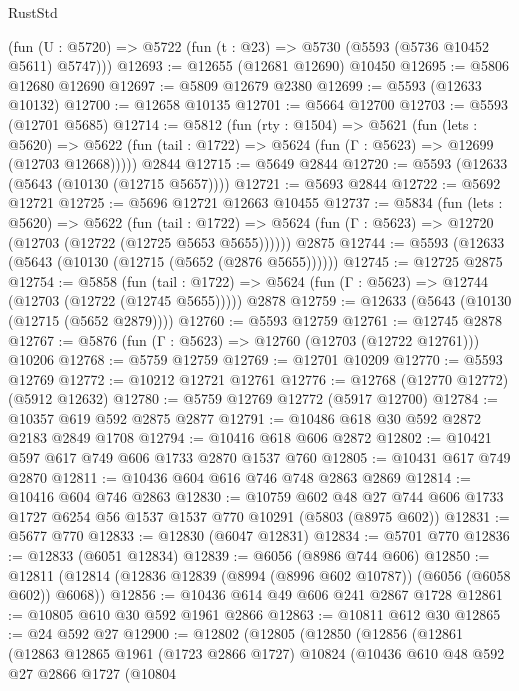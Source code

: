 \begin{lexlean}{RustStd}
\begin{coremodule}
    (fun (U : @5720) => @5722 (fun (t : @23) => @5730 (@5593 (@5736 @10452 @5611) @5747)))
@12693 := @12655 (@12681 @12690) @10450
@12695 := @5806 @12680 @12690
@12697 := @5809 @12679 @2380
@12699 := @5593 (@12633 @10132)
@12700 := @12658 @10135
@12701 := @5664 @12700
@12703 := @5593 (@12701 @5685)
@12714 := @5812
    (fun (rty : @1504) =>
    @5621
      (fun (lets : @5620) =>
      @5622 (fun (tail : @1722) => @5624 (fun (Γ : @5623) => @12699 (@12703 @12668)))))
    @2844
@12715 := @5649 @2844
@12720 := @5593 (@12633 (@5643 (@10130 (@12715 @5657))))
@12721 := @5693 @2844
@12722 := @5692 @12721
@12725 := @5696 @12721 @12663 @10455
@12737 := @5834
    (fun (lets : @5620) =>
    @5622
      (fun (tail : @1722) =>
      @5624 (fun (Γ : @5623) => @12720 (@12703 (@12722 (@12725 @5653 @5655))))))
    @2875
@12744 := @5593 (@12633 (@5643 (@10130 (@12715 (@5652 (@2876 @5655))))))
@12745 := @12725 @2875
@12754 := @5858
    (fun (tail : @1722) => @5624 (fun (Γ : @5623) => @12744 (@12703 (@12722 (@12745 @5655)))))
    @2878
@12759 := @12633 (@5643 (@10130 (@12715 (@5652 @2879))))
@12760 := @5593 @12759
@12761 := @12745 @2878
@12767 := @5876 (fun (Γ : @5623) => @12760 (@12703 (@12722 @12761))) @10206
@12768 := @5759 @12759
@12769 := @12701 @10209
@12770 := @5593 @12769
@12772 := @10212 @12721 @12761
@12776 := @12768 (@12770 @12772) (@5912 @12632)
@12780 := @5759 @12769 @12772 (@5917 @12700)
@12784 := @10357 @619 @592 @2875 @2877
@12791 := @10486 @618 @30 @592 @2872 @2183 @2849 @1708
@12794 := @10416 @618 @606 @2872
@12802 := @10421 @597 @617 @749 @606 @1733 @2870 @1537 @760
@12805 := @10431 @617 @749 @2870
@12811 := @10436 @604 @616 @746 @748 @2863 @2869
@12814 := @10416 @604 @746 @2863
@12830 := @10759
    @602
    @48
    @27
    @744
    @606
    @1733
    @1727
    @6254
    @56
    @1537
    @1537
    @770
    @10291
    (@5803 (@8975 @602))
@12831 := @5677 @770
@12833 := @12830 (@6047 @12831)
@12834 := @5701 @770
@12836 := @12833 (@6051 @12834)
@12839 := @6056 (@8986 @744 @606)
@12850 := @12811 (@12814 (@12836 @12839 (@8994 (@8996 @602 @10787)) (@6056 (@6058 @602)) @6068))
@12856 := @10436 @614 @49 @606 @241 @2867 @1728
@12861 := @10805 @610 @30 @592 @1961 @2866
@12863 := @10811 @612 @30
@12865 := @24 @592 @27
@12900 := @12802
    (@12805
      (@12850
        (@12856
          (@12861
            (@12863
              @12865
              @1961
              (@1723 @2866 @1727)
              @10824
              (@10436
                @610
                @48
                @592
                @27
                @2866
                @1727
                (@10804

\end{coremodule}
\end{lexlean}
